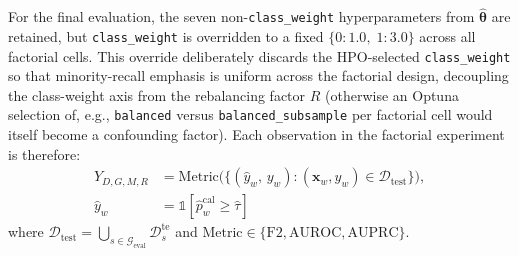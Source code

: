 \documentclass[lettersize,journal]{IEEEtran}
\begin{document}
For the final evaluation, the seven non-\texttt{class\_weight} hyperparameters from $\hat{\boldsymbol{\theta}}$ are retained, but \texttt{class\_weight} is overridden to a fixed $\{0{:}1.0,\;1{:}3.0\}$ across all factorial cells.
This override deliberately discards the HPO-selected \texttt{class\_weight} so that minority-recall emphasis is uniform across the factorial design, decoupling the class-weight axis from the rebalancing factor $R$ (otherwise an Optuna selection of, e.g., \texttt{balanced} versus \texttt{balanced\_subsample} per factorial cell would itself become a confounding factor).
Each observation in the factorial experiment is therefore:
\begin{align}
\label{eq:observation}
Y_{D,G,M,R} &= \mathrm{Metric}\!\bigl(\bigl\{ (\hat{y}_w,\, y_w) : (\mathbf{x}_w, y_w) \in \mathcal{D}_{\mathrm{test}} \bigr\}\bigr), \nonumber\\
\hat{y}_w &= \mathbb{1}\!\left[\hat{p}_w^{\mathrm{cal}} \geq \hat{\tau}\right]
\end{align}
where $\mathcal{D}_{\mathrm{test}} = \bigcup_{s \in \mathcal{G}_{\mathrm{eval}}} \mathcal{D}_s^{\mathrm{te}}$ and $\mathrm{Metric} \in \{\mathrm{F2}, \mathrm{AUROC}, \mathrm{AUPRC}\}$.

\begin{table}[!t]
\caption{Random Forest Hyperparameter Search Space (Optuna, 100 TPE Trials)\label{tab:hpo}}
\centering
{}
\end{table}
\end{document}
